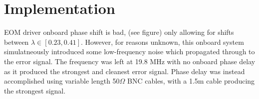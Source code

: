 \newpage
\section{Implementation}

EOM driver onboard phase shift is bad, (see figure) only allowing for shifts between $\lambda \in [0.23, 0.41]$. However, for reasons unknown, this onboard system simulatneously introduced some low-frequency noise which propagated through to the error signal. The frequency was left at 19.8 MHz with no onboard phase delay as it produced the strongest and cleanest error signal. Phase delay was instead accomplished using variable length 50$\Omega$ BNC cables, with a 1.5m cable producing the strongest signal.